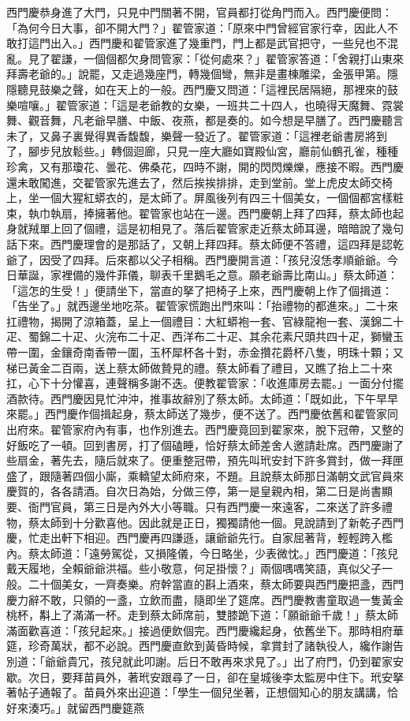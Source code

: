 西門慶恭身進了大門，只見中門關著不開，官員都打從角門而入。西門慶便問：「為何今日大事，卻不開大門？」翟管家道：「原來中門曾經官家行幸，因此人不敢打這門出入。」西門慶和翟管家進了幾重門，門上都是武官把守，一些兒也不混亂。見了翟謙，一個個都欠身問管家：「從何處來？」翟管家答道：「舍親打山東來拜壽老爺的。」說罷，又走過幾座門，轉幾個彎，無非是畫棟雕梁，金張甲第。隱隱聽見鼓樂之聲，如在天上的一般。西門慶又問道：「這裡民居隔絕，那裡來的鼓樂喧嚷。」翟管家道：「這是老爺教的女樂，一班共二十四人，也曉得天魔舞、霓裳舞、觀音舞，凡老爺早膳、中飯、夜燕，都是奏的。如今想是早膳了。西門慶聽言未了，又鼻子裏覺得異香馥馥，樂聲一發近了。翟管家道：「這裡老爺書房將到了，腳步兒放鬆些。」轉個迴廊，只見一座大廳如寶殿仙宮，廳前仙鶴孔雀，種種珍禽，又有那瓊花、曇花、佛桑花，四時不謝，開的閃閃爍爍，應接不暇。西門慶還未敢闖進，交翟管家先進去了，然后挨挨排排，走到堂前。堂上虎皮太師交椅上，坐一個大猩紅蟒衣的，是太師了。屏風後列有四三十個美女，一個個都宮樣粧束，執巾執扇，捧擁著他。翟管家也站在一邊。西門慶朝上拜了四拜，蔡太師也起身就羢單上回了個禮，這是初相見了。落后翟管家走近蔡太師耳邊，暗暗說了幾句話下來。西門慶理會的是那話了，又朝上拜四拜。蔡太師便不答禮，這四拜是認乾爺了，因受了四拜。后來都以父子相稱。西門慶開言道：「孩兒沒恁孝順爺爺。今日華誕，家裡備的幾件菲儀，聊表千里鵝毛之意。願老爺壽比南山。」蔡太師道：「這怎的生受！」便請坐下，當直的拏了把椅子上來，西門慶朝上作了個揖道：「告坐了。」就西邊坐地吃茶。翟管家慌跑出門來叫：「抬禮物的都進來。」二十來扛禮物，揭開了涼箱蓋，呈上一個禮目：大紅蟒袍一套、官綠龍袍一套、漢錦二十疋、蜀錦二十疋、火浣布二十疋、西洋布二十疋、其余花素尺頭共四十疋，獅蠻玉帶一圍，金鑲奇南香帶一圍，玉杯犀杯各十對，赤金攢花爵杯八隻，明珠十顆；又梯已黃金二百兩，送上蔡太師做贄見的禮。蔡太師看了禮目，又瞧了抬上二十來扛，心下十分懽喜，連聲稱多謝不迭。便教翟管家：「收進庫房去罷。」一面分付擺酒款待。西門慶因見忙沖沖，推事故辭別了蔡太師。太師道：「既如此，下午早早來罷。」西門慶作個揖起身，蔡太師送了幾步，便不送了。西門慶依舊和翟管家同出府來。翟管家府內有事，也作別進去。西門慶竟回到翟家來，脫下冠帶，又整的好飯吃了一頓。回到書房，打了個磕睡，恰好蔡太師差舍人邀請赴席。西門慶謝了些扇金，著先去，隨后就來了。便重整冠帶，預先叫玳安封下許多賞封，做一拜匣盛了，跟隨著四個小廝，乘轎望太師府來，不題。且說蔡太師那日滿朝文武官員來慶賀的，各各請酒。自次日為始，分做三停，第一是皇親內相，第二日是尚書顯要、衙門官員，第三日是內外大小等職。只有西門慶一來遠客，二來送了許多禮物，蔡太師到十分歡喜他。因此就是正日，獨獨請他一個。見說請到了新乾子西門慶，忙走出軒下相迎。西門慶再四謙遜，讓爺爺先行。自家屈著背，輕輕跨入檻內。蔡太師道：「遠勞駕從，又損隆儀，今日略坐，少表微忱。」西門慶道：「孩兒戴天履地，全賴爺爺洪福。些小敬意，何足掛懷？」兩個喁喁笑語，真似父子一般。二十個美女，一齊奏樂。府幹當直的斟上酒來，蔡太師要與西門慶把盞，西門慶力辭不敢，只領的一盞，立飲而盡，隨即坐了筵席。西門慶教書童取過一隻黃金桃杯，斠上了滿滿一杯。走到蔡太師席前，雙膝跪下道：「願爺爺千歲！」蔡太師滿面歡喜道：「孩兒起來。」接過便飲個完。西門慶纔起身，依舊坐下。那時相府華筵，珍奇萬狀，都不必說。西門慶直飲到黃昏時候，拿賞封了諸執役人，纔作謝告別道：「爺爺貴冗，孩兒就此叩謝。后日不敢再來求見了。」出了府門，仍到翟家安歇。次日，要拜苗員外，著玳安跟尋了一日，卻在皇城後李太監房中住下。玳安拏著帖子通報了。苗員外來出迎道：「學生一個兒坐著，正想個知心的朋友講講，恰好來湊巧。」就留西門慶筵燕
